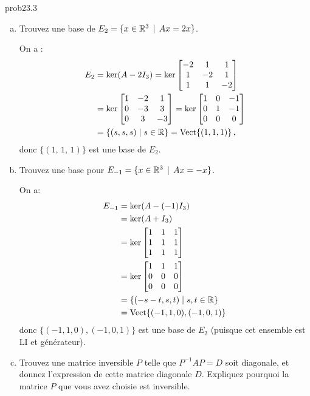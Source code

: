 \begin{sol}{prob23.3}
\begin{enumerate}[a)]
\medskip
\item Trouvez une base de $E_2 =\{x\in \mathbb{R}^3 \, \mid \, Ax= 2x\}$.

\soln On a :
\begin{align*} 
E_2 &= \ker(A-2I_3) = \ker\begin{bmatrix} -2 & 1 & 1\\ 1 & -2 & 1\\ 1 & 1 & -2 \end{bmatrix}\\ 
&= \ker \begin{bmatrix} 1&-2&1\\0&-3&3\\0&3&-3\end{bmatrix} =
\ker \begin{bmatrix} 1&0&-1\\0&1&-1\\0&0&0\end{bmatrix}\\
&= \{ (s,s,s) \mid s\in \mathbb{R}\} = \textrm{Vect}\{ (1,1,1) \}\,,
\end{align*}
donc $\{(1,\,1,\,1)\}$ est une base de $E_2$.

\medskip
\item Trouvez une base pour $E_{-1} =\{x\in \mathbb{R}^3 \, \mid \, Ax=-x\}$. 
 
 \soln On a:
 \begin{align*}
E_{-1} &= \ker(A-(-1)I_3) \\
&= \ker(A+I_3) \\
&= \ker\begin{bmatrix} 1 & 1 & 1\\ 1 & 1 & 1\\ 1 & 1 & 1 \end{bmatrix}\\ 
&= \ker \begin{bmatrix} 1&1&1\\0&0&0\\0&0&0\end{bmatrix} \\
&= \{ (-s-t,s,t) \mid s,t\in \mathbb{R}\} \\
&= \textrm{Vect}\{ (-1,1,0),(-1,0,1) \}\,
\end{align*}
donc $\{ (-1,1,0),(-1,0,1) \}$ est une base de $E_2$ (puisque cet ensemble est LI et générateur).

\medskip
\item Trouvez une matrice inversible 
$P$ telle que $P^{-1}AP=D$ soit diagonale, et donnez l'expression de cette matrice diagonale $D$. Expliquez pourquoi
la matrice $P$ que vous avez choisie est inversible.


\end{enumerate}
\end{sol}
